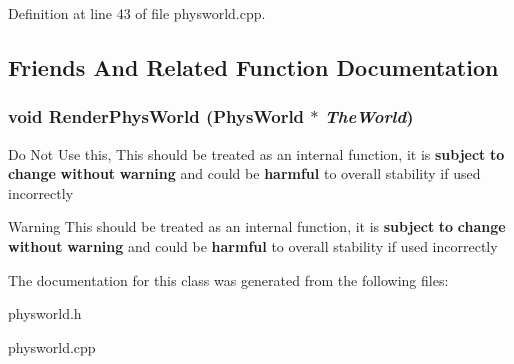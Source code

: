 Definition at line 43 of file physworld.cpp.

\subsection{Friends And Related Function Documentation}
\hypertarget{classPhysWorld_a54ca2a75bbccb9b2129f434874f1e693}{
\subsubsection[{RenderPhysWorld}]{\setlength{\rightskip}{0pt plus 5cm}void RenderPhysWorld ({\bf PhysWorld} $\ast$ {\em TheWorld})}}
\label{db/df5/classPhysWorld_a54ca2a75bbccb9b2129f434874f1e693}
Do Not Use this, This should be treated as an internal function, it is {\bfseries subject} {\bfseries to} {\bfseries change} {\bfseries without} {\bfseries warning} and could be {\bfseries harmful} to overall stability if used incorrectly \begin{DoxyWarning}{Warning}
This should be treated as an internal function, it is {\bfseries subject} {\bfseries to} {\bfseries change} {\bfseries without} {\bfseries warning} and could be {\bfseries harmful} to overall stability if used incorrectly 
\end{DoxyWarning}


The documentation for this class was generated from the following files:\begin{DoxyCompactItemize}
\item 
physworld.h\item 
physworld.cpp\end{DoxyCompactItemize}
